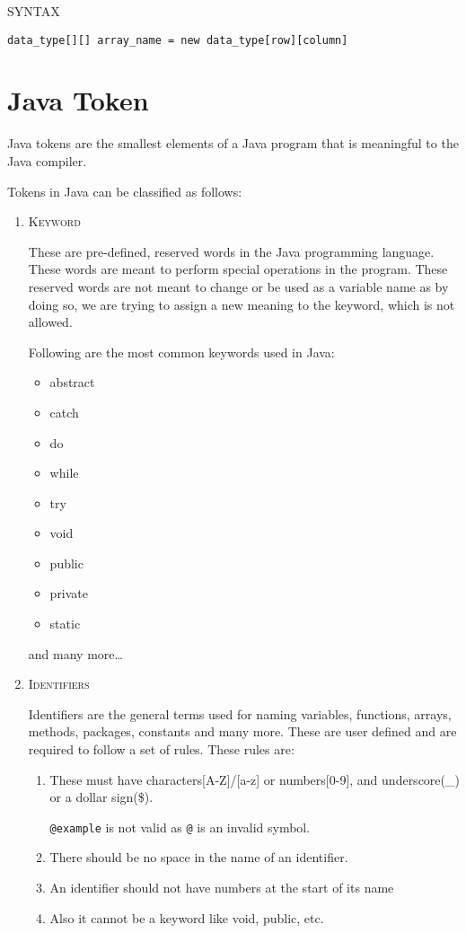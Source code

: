\documentclass[a4paper, 12pt]{scrarticle}
\begin{document}
SYNTAX

\verb+data_type[][] array_name = new data_type[row][column]+

\section{Java Token}
Java tokens are the smallest elements of a Java program that is meaningful to the Java compiler.

Tokens in Java can be classified as follows:

\begin{enumerate}
  \item \textsc{Keyword}

    These are pre-defined, reserved words in the Java programming language. These words are meant to perform special operations in the program. These reserved words are not meant to change or be used as a variable name as by doing so, we are trying to assign a new meaning to the keyword,
    which is not allowed.

    Following are the most common keywords used in Java:
    \begin{itemize}
      \item abstract
      \item catch
      \item do 
      \item while 
      \item try 
      \item void 
      \item public
      \item private
      \item static
    \end{itemize}
    and many more\dots

  \item \textsc{Identifiers}

    Identifiers are the general terms used for naming variables, functions, arrays, methods, packages, constants and many more. These are user defined and are required to follow a set of rules. These rules are:

    \begin{enumerate}
      \item These must have characters[A-Z]/[a-z] or numbers[0-9], and underscore(\_) or a dollar sign(\$).

        \verb+@example+ is not valid as \verb+@+ is an invalid symbol.

      \item There should be no space in the name of an identifier.
      \item An identifier should not have numbers at the start of its name
      \item Also it cannot be a keyword like void, public, etc.
    \end{enumerate}


\end{enumerate}
\end{document}

